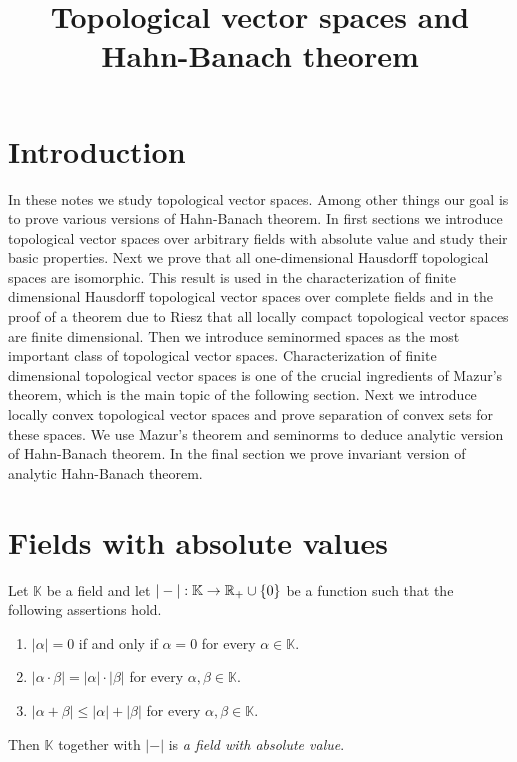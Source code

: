 



\title{Topological vector spaces and Hahn-Banach theorem}
\date{}
\maketitle

\section{Introduction}
\noindent
In these notes we study topological vector spaces. Among other things our goal is to prove various versions of Hahn-Banach theorem. In first sections we introduce topological vector spaces over arbitrary fields with absolute value and study their basic properties. Next we prove that all one-dimensional Hausdorff topological spaces are isomorphic. This result is used in the characterization of finite dimensional Hausdorff topological vector spaces over complete fields and in the proof of a theorem due to Riesz that all locally compact topological vector spaces are finite dimensional. Then we introduce seminormed spaces as the most important class of topological vector spaces. Characterization of finite dimensional topological vector spaces is one of the crucial ingredients of Mazur's theorem, which is the main topic of the following section. Next we introduce locally convex topological vector spaces and prove separation of convex sets for these spaces. We use Mazur's theorem and seminorms to deduce analytic version of Hahn-Banach theorem. In the final section we prove invariant version of analytic Hahn-Banach theorem.

\section{Fields with absolute values}

\begin{definition}
   Let $\mathbb{K}$ be a field and let $|-|:\mathbb{K}\rightarrow {\mathbb R}_+\cup \{0\}$ be a function such that the following assertions hold.
   \begin{enumerate}[label=\textbf{(\arabic*)}, leftmargin=*]
      \item $|\alpha| = 0$ if and only if $\alpha = 0$ for every $\alpha \in \mathbb{K}$.
      \item $|\alpha\cdot \beta| = |\alpha|\cdot |\beta|$ for every $\alpha,\beta \in \mathbb{K}$.
      \item $|\alpha + \beta|\leq |\alpha| + |\beta|$ for every $\alpha,\beta \in \mathbb{K}$.
   \end{enumerate}
   Then $\mathbb{K}$ together with $|-|$ is \textit{a field with absolute value}.
\end{definition}

